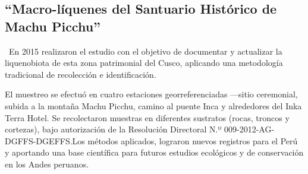 \subsection{“Macro-líquenes del Santuario Histórico de Machu Picchu”}\
En 2015 realizaron el estudio con el objetivo de documentar y actualizar la liquenobiota de esta zona patrimonial del Cusco, aplicando una metodología tradicional de recolección e identificación.

El muestreo se efectuó en cuatro estaciones georreferenciadas —sitio ceremonial, subida a la montaña Machu Picchu, camino al puente Inca y alrededores del Inka Terra Hotel. Se recolectaron muestras en diferentes sustratos (rocas, troncos y cortezas), bajo autorización de la Resolución Directoral N.º 009-2012-AG-DGFFS-DGEFFS.Los métodos aplicados, lograron nuevos registros para el Perú y aportando una base científica para futuros estudios ecológicos y de conservación en los Andes peruanos.\cite{nunez2015nuevos}

